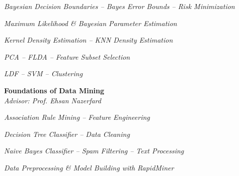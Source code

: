 \documentclass[margin, 10pt]{res} %
\begin{document}
\begin{resume}
\begin{innerlist}
			\item \textit{Bayesian Decision Boundaries -- Bayes Error Bounds -- Risk Minimization} \href{https://github.com/aligholamee/Patterns/raw/master/docs/assignment-2/SPR_9531504_HW2.pdf}{\hfill\UrlFont[docs]}

			\item \textit{Maximum Likelihood \& Bayesian Parameter Estimation} \href{https://github.com/aligholamee/Patterns/raw/master/docs/assignment-3/SPR_9531504_HW3.pdf}{\hfill\UrlFont[docs]}
			
			
			\item \textit{Kernel Density Estimation -- KNN Density Estimation} \href{https://github.com/aligholamee/Patterns/raw/master/docs/assignment-4/SPR_9531504_HW4.pdf}{\hfill\UrlFont[docs]}
			
			\item \textit{PCA -- FLDA -- Feature Subset Selection} \href{https://github.com/aligholamee/Patterns/raw/master/docs/assignment-5/SPR_9531504_HW5.pdf}{\hfill\UrlFont[docs]}
		
			\item \textit{LDF -- SVM -- Clustering} \href{https://github.com/aligholamee/Patterns/raw/master/docs/assignment-6/SPR_9531504_HW6.pdf}{\hfill\UrlFont[docs]}
		\end{innerlist}

        \textbf{Foundations of Data Mining}\\
		\textit{Advisor: Prof. Ehsan Nazerfard}
		\begin{innerlist}
			\item \textit{Association Rule Mining -- Feature Engineering} \href{https://github.com/aligholamee/Datadigger/raw/master/docs/assignment-1/report/DM_9531504_HW1.pdf}{\hfill\UrlFont[docs]}
			
			\item \textit{Decision Tree Classifier -- Data Cleaning} \href{https://github.com/aligholamee/Datadigger/raw/master/docs/assignment-2/report/DM_9531504_HW2.pdf}{\hfill\UrlFont[docs]}
			
			\item \textit{Naive Bayes Classifier -- Spam Filtering -- Text Processing} \href{https://github.com/aligholamee/Datadigger/raw/master/docs/assignment-3/report/DM_9531504_HW3.pdf}{\hfill\UrlFont[docs]}
			
			\item \textit{Data Preprocessing \& Model Building with \textit{RapidMiner}} \href{https://github.com/aligholamee/Datadigger/raw/master/docs/assignment-4/report/DM_9531504_HW4.pdf}{\hfill\UrlFont[docs]}
		\end{innerlist}


\end{resume}
\end{document}
